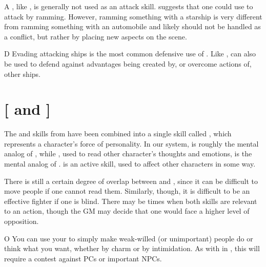 \documentclass[12pt,titlepage,openany]{book}
\begin{document}
\begin{NewSkillAction}{A}
    , like , is generally not used as an attack
    skill. \FateCore{} suggests that one could use  to attack by
    ramming. However, ramming something with a starship is very different from
    ramming something with an automobile and likely should not be handled as a
    conflict, but rather by placing new aspects on the scene.
\end{NewSkillAction}

\begin{NewSkillAction}{D}
    Evading attacking ships is the most common defensive use of .
    Like ,  can also be used to defend against
    advantages being created by, or overcome actions of, other ships.
\end{NewSkillAction}

\section{ [ and ]}\label{sec:presence}
The  and  skills from \FateCore{} have been
combined into a single skill called , which represents a
character's force of personality. In our system,  is roughly
the mental analog of , while , used to read other
character's thoughts and emotions, is the mental analog of .
 is an active skill, used to affect other characters in some
way.

There is still a certain degree of overlap between  and
, since it can be difficult to move people if one cannot read
them. Similarly, though, it is difficult to be an effective fighter if one is
blind. There may be times when both skills are relevant to an action, though
the GM may decide that one would face a higher level of opposition.

\vspace{1ex}

\begin{NewSkillAction}{O}
    You can use your  to simply make weak-willed (or
    unimportant) people do or think what you want, whether by charm or by
    intimidation. As with  in \FateCore{}, this will require a
    contest against PCs or important NPCs.
\end{NewSkillAction}
\end{document}
